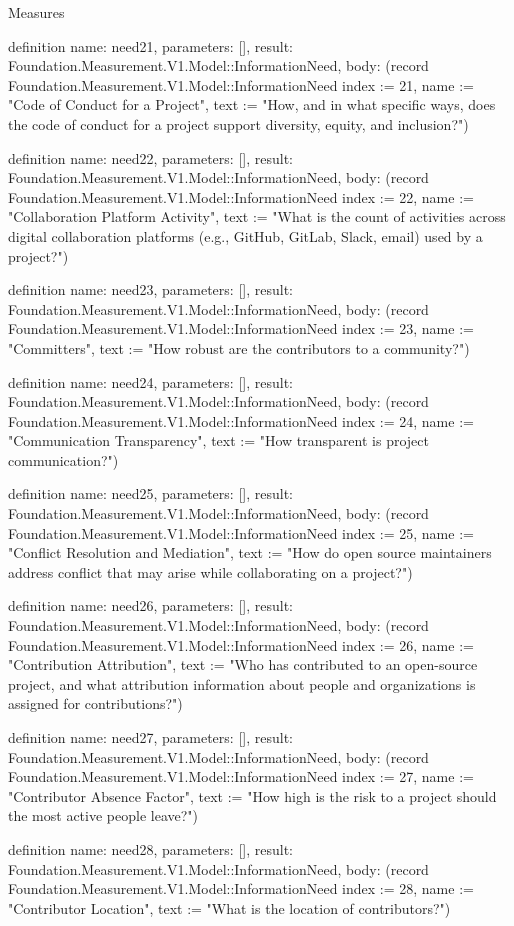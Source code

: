 \begin{lexlean}{Measures}
\begin{semanticmodule}
definition{
  name: need21,
  parameters: [],
  result: Foundation.Measurement.V1.Model::InformationNeed,
  body: (record Foundation.Measurement.V1.Model::InformationNeed {index := 21, name := "Code of Conduct for a Project", text := "How, and in what specific ways, does the code of conduct for a project support diversity, equity, and inclusion?"})
}

definition{
  name: need22,
  parameters: [],
  result: Foundation.Measurement.V1.Model::InformationNeed,
  body: (record Foundation.Measurement.V1.Model::InformationNeed {index := 22, name := "Collaboration Platform Activity", text := "What is the count of activities across digital collaboration platforms (e.g., GitHub, GitLab, Slack, email) used by a project?"})
}

definition{
  name: need23,
  parameters: [],
  result: Foundation.Measurement.V1.Model::InformationNeed,
  body: (record Foundation.Measurement.V1.Model::InformationNeed {index := 23, name := "Committers", text := "How robust are the contributors to a community?"})
}

definition{
  name: need24,
  parameters: [],
  result: Foundation.Measurement.V1.Model::InformationNeed,
  body: (record Foundation.Measurement.V1.Model::InformationNeed {index := 24, name := "Communication Transparency", text := "How transparent is project communication?"})
}

definition{
  name: need25,
  parameters: [],
  result: Foundation.Measurement.V1.Model::InformationNeed,
  body: (record Foundation.Measurement.V1.Model::InformationNeed {index := 25, name := "Conflict Resolution and Mediation", text := "How do open source maintainers address conflict that may arise while collaborating on a project?"})
}

definition{
  name: need26,
  parameters: [],
  result: Foundation.Measurement.V1.Model::InformationNeed,
  body: (record Foundation.Measurement.V1.Model::InformationNeed {index := 26, name := "Contribution Attribution", text := "Who has contributed to an open-source project, and what attribution information about people and organizations is assigned for contributions?"})
}

definition{
  name: need27,
  parameters: [],
  result: Foundation.Measurement.V1.Model::InformationNeed,
  body: (record Foundation.Measurement.V1.Model::InformationNeed {index := 27, name := "Contributor Absence Factor", text := "How high is the risk to a project should the most active people leave?"})
}

definition{
  name: need28,
  parameters: [],
  result: Foundation.Measurement.V1.Model::InformationNeed,
  body: (record Foundation.Measurement.V1.Model::InformationNeed {index := 28, name := "Contributor Location", text := "What is the location of contributors?"})
}


\end{semanticmodule}
\end{lexlean}
